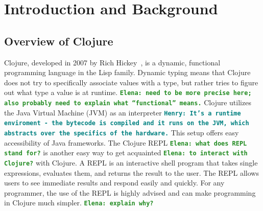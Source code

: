 \documentclass[12pt]{article}
\newcommand{\comment}[1]{{\bf \tt  {#1}}}
\newcommand{\emcomment}[1]{\textcolor{ForestGreen}{\comment{Elena: {#1}}}}
\newcommand{\hfcomment}[1]{\textcolor{Teal}{\comment{Henry: {#1}}}}
\begin{document}
\section{Introduction and Background}\label{sec:intro}
\subsection{Overview of Clojure}\label{sec:clojure}
  
  
Clojure, developed in 2007 by Rich Hickey~\cite{Hickey:2008}, is a dynamic, functional
programming language in the Lisp family. Dynamic typing means that Clojure does not try to specifically associate
values with a type, but rather tries to figure out what type a value is at runtime.
\emcomment{need to be more precise here; also probably need to explain what ``functional'' means.}
Clojure utilizes the Java Virtual Machine (JVM) as an interpreter \hfcomment{It's a runtime enviroment - the bytecode is compiled and it runs on the JVM, which abstracts over the specifics of the hardware.}
This setup offers easy 
accessibility of Java frameworks. The Clojure REPL
\emcomment{what does REPL stand for?} 
is another easy way to get acquainted \emcomment{to interact with Clojure?} with Clojure. A REPL is an interactive shell program that takes single 
expressions, evaluates them, and returns the result to the user. The REPL allows users to see immediate results
 and respond easily and quickly. For any programmer, the use of the REPL 
is highly advised and can make programming in Clojure much simpler. 
\emcomment{explain why?}
\end{document}
